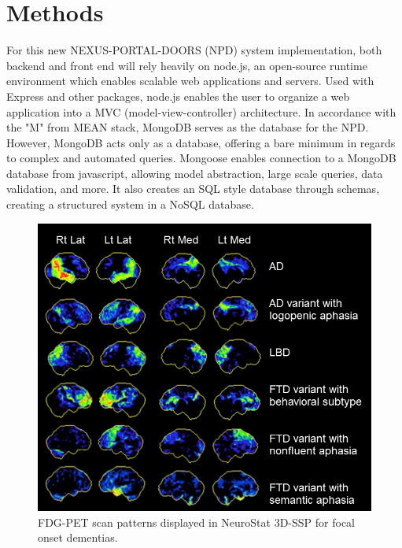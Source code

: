 \documentclass[10pt,twocolumn,twoside]{article}
\begin{document}
\section*{Methods}
\label{secMethods}
	For this new NEXUS-PORTAL-DOORS (NPD) system implementation, both backend and front end will rely heavily on node.js, an open-source runtime environment which enables scalable web applications and servers. Used with Express and other packages, node.js enables the user to organize a web application into a MVC (model-view-controller) architecture. In accordance with the "M" from MEAN stack, MongoDB serves as the database for the NPD. However, MongoDB acts only as a database, offering a bare minimum in regards to complex and automated queries. Mongoose enables connection to a MongoDB database from javascript, allowing model abstraction, large scale queries, data validation, and more. It also creates an SQL style database through schemas, creating a structured system in a NoSQL database. 
\begin{figure}[ht]
{\centering
\includegraphics[width=6.5in]{FDGPETFOD_patterns_ctrev3.png}
\caption{FDG-PET scan patterns displayed in NeuroStat 3D-SSP for focal onset dementias.}
\label{figADPatterns} }
\end{figure}
\end{document}
